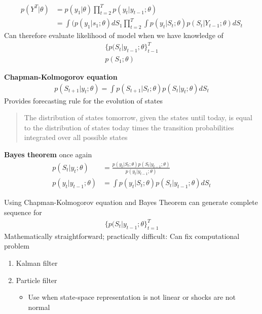 \documentclass{beamer}
\begin{document}
\begin{frame}
  \begin{align}
   p(Y^T|\theta) &= p(y_1|\theta) \prod^T_{t=2}p(y_t|y_{t-1};\theta)\\
   &= \int(p(y_1|s_1;\theta)dS_1\prod^T_{t=2} \int p(y_t|S_t;\theta) p(S_t|Y_{t-1};\theta)dS_t
  \end{align}
  \medskip
  Can therefore evaluate likelihood of model when we have knowledge of
  \begin{align}
    \{p(S_t|y_{t-1};\theta \} ^T_{t-1}\\
    p(S_1;\theta)
  \end{align} 
\end{frame}

\begin{frame}
  \textbf{Chapman-Kolmogorov equation}
  \begin{align}
    p(S_{t+1}|y_t;\theta)=\int p(S_{t+1}|S_t;\theta)p(S_t|y_t;\theta)dS_t
  \end{align}
  \medskip
  Provides forecasting rule for the evolution of states
  \begin{quote}
    The distribution of states tomorrow, given the states until today, is equal to the distribution of states today times the transition probabilities integrated over all possible states
  \end{quote}
\end{frame}

\begin{frame}
  \textbf{Bayes theorem} once again
  \begin{align}
    p(S_t|y_t;\theta)&=\frac{p(y_t|S_t;\theta)p(S_t|y_{t-1};\theta)}{p(y_t|y_{t-1};\theta)}\\
    p(y_t|y_{t-1};\theta) &= \int p(y_t|S_t;\theta)p(S_t|y_{t-1};\theta)dS_t
  \end{align}
\end{frame}

\begin{frame}
  Using Chapman-Kolmogorov equation and Bayes Theorem can generate complete sequence for
  \begin{align}
    \{p(S_t|y_{t-1};\theta\}^T_{t=1}
  \end{align}
  \medskip
  Mathematically straightforward; practically difficult: Can fix computational problem
  \begin{enumerate}
    \item Kalman filter
    \item Particle filter
    \begin{itemize}
      \item Use when state-space representation is not linear or shocks are not normal
    \end{itemize}
  \end{enumerate}
\end{frame}
\end{document}
